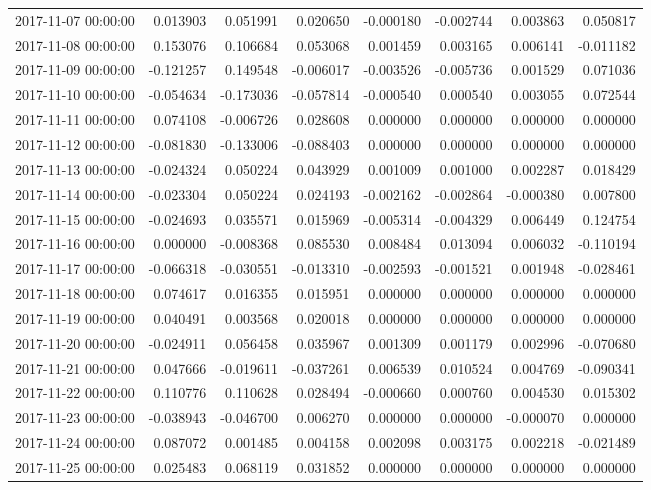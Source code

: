 \begin{tabular}{lrrrrrrr}
2017-11-07 00:00:00 & 0.013903 & 0.051991 & 0.020650 & -0.000180 & -0.002744 & 0.003863 & 0.050817 \\
2017-11-08 00:00:00 & 0.153076 & 0.106684 & 0.053068 & 0.001459 & 0.003165 & 0.006141 & -0.011182 \\
2017-11-09 00:00:00 & -0.121257 & 0.149548 & -0.006017 & -0.003526 & -0.005736 & 0.001529 & 0.071036 \\
2017-11-10 00:00:00 & -0.054634 & -0.173036 & -0.057814 & -0.000540 & 0.000540 & 0.003055 & 0.072544 \\
2017-11-11 00:00:00 & 0.074108 & -0.006726 & 0.028608 & 0.000000 & 0.000000 & 0.000000 & 0.000000 \\
2017-11-12 00:00:00 & -0.081830 & -0.133006 & -0.088403 & 0.000000 & 0.000000 & 0.000000 & 0.000000 \\
2017-11-13 00:00:00 & -0.024324 & 0.050224 & 0.043929 & 0.001009 & 0.001000 & 0.002287 & 0.018429 \\
2017-11-14 00:00:00 & -0.023304 & 0.050224 & 0.024193 & -0.002162 & -0.002864 & -0.000380 & 0.007800 \\
2017-11-15 00:00:00 & -0.024693 & 0.035571 & 0.015969 & -0.005314 & -0.004329 & 0.006449 & 0.124754 \\
2017-11-16 00:00:00 & 0.000000 & -0.008368 & 0.085530 & 0.008484 & 0.013094 & 0.006032 & -0.110194 \\
2017-11-17 00:00:00 & -0.066318 & -0.030551 & -0.013310 & -0.002593 & -0.001521 & 0.001948 & -0.028461 \\
2017-11-18 00:00:00 & 0.074617 & 0.016355 & 0.015951 & 0.000000 & 0.000000 & 0.000000 & 0.000000 \\
2017-11-19 00:00:00 & 0.040491 & 0.003568 & 0.020018 & 0.000000 & 0.000000 & 0.000000 & 0.000000 \\
2017-11-20 00:00:00 & -0.024911 & 0.056458 & 0.035967 & 0.001309 & 0.001179 & 0.002996 & -0.070680 \\
2017-11-21 00:00:00 & 0.047666 & -0.019611 & -0.037261 & 0.006539 & 0.010524 & 0.004769 & -0.090341 \\
2017-11-22 00:00:00 & 0.110776 & 0.110628 & 0.028494 & -0.000660 & 0.000760 & 0.004530 & 0.015302 \\
2017-11-23 00:00:00 & -0.038943 & -0.046700 & 0.006270 & 0.000000 & 0.000000 & -0.000070 & 0.000000 \\
2017-11-24 00:00:00 & 0.087072 & 0.001485 & 0.004158 & 0.002098 & 0.003175 & 0.002218 & -0.021489 \\
2017-11-25 00:00:00 & 0.025483 & 0.068119 & 0.031852 & 0.000000 & 0.000000 & 0.000000 & 0.000000 \\

\end{tabular}
